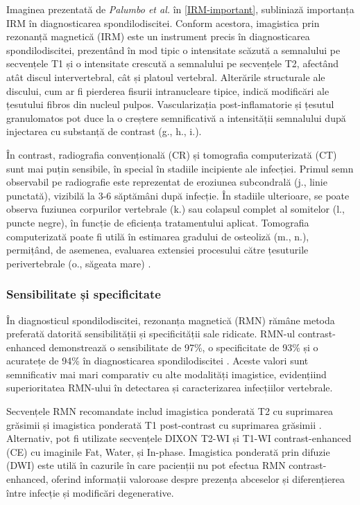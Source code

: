 \message{ !name(LaMain.tex)}\documentclass[romanian,12pt,a4paper]{article}
\begin{document}
Imaginea prezentată de \emph{Palumbo et al.} în
\ref{IRM-important}{}, subliniază importanța IRM în
diagnosticarea spondilodiscitei. Conform acestora, imagistica prin
rezonanță magnetică (IRM) este un instrument precis în diagnosticarea
spondilodiscitei, prezentând în mod tipic o intensitate scăzută a
semnalului pe secvențele T1 și o intensitate crescută a semnalului pe
secvențele T2, afectând atât discul intervertebral, cât și platoul
vertebral. Alterările structurale ale discului, cum ar fi pierderea
fisurii intranucleare tipice, indică modificări ale țesutului fibros din
nucleul pulpos. Vascularizația post-inflamatorie și țesutul granulomatos
pot duce la o creștere semnificativă a intensității semnalului după
injectarea cu substanță de contrast (g., h., i.).

În contrast, radiografia convențională (CR) și tomografia computerizată
(CT) sunt mai puțin sensibile, în special în stadiile incipiente ale
infecției. Primul semn observabil pe radiografie este reprezentat de
eroziunea subcondrală (j., linie punctată), vizibilă la 3-6 săptămâni
după infecție. În stadiile ulterioare, se poate observa fuziunea
corpurilor vertebrale (k.) sau colapsul complet al somitelor (l., puncte
negre), în funcție de eficiența tratamentului aplicat. Tomografia
computerizată poate fi utilă în estimarea gradului de osteoliză (m.,
n.), permițând, de asemenea, evaluarea extensiei procesului către
țesuturile perivertebrale (o., săgeata mare)
\cite{DiagnosticInterventionalManagement2020}.

\subsubsection{Sensibilitate și specificitate}

În diagnosticul spondilodiscitei, rezonanța magnetică (RMN) rămâne
metoda preferată datorită sensibilității și specificității sale
ridicate. RMN-ul contrast-enhanced demonstrează o sensibilitate de 97\%,
o specificitate de 93\% și o acuratețe de 94\% în diagnosticarea
spondilodiscitei \cite{ComparisonDiagnosticValue2017}. Aceste valori sunt
semnificativ mai mari comparativ cu alte modalități imagistice,
evidențiind superioritatea RMN-ului în detectarea și caracterizarea
infecțiilor vertebrale.

Secvențele RMN recomandate includ imagistica ponderată T2 cu suprimarea
grăsimii și imagistica ponderată T1 post-contrast cu suprimarea grăsimii
\cite{ComparisonDiagnosticValue2017}. Alternativ, pot fi utilizate
secvențele DIXON T2-WI și T1-WI contrast-enhanced (CE) cu imaginile Fat,
Water, și In-phase. Imagistica ponderată prin difuzie (DWI) este utilă
în cazurile în care pacienții nu pot efectua RMN contrast-enhanced,
oferind informații valoroase despre prezența abceselor și diferențierea
între infecție și modificări degenerative.
\end{document}
